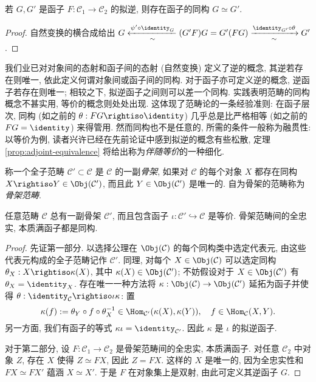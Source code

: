 \begin{proposition}
	若 $G, G'$ 是函子 $F: \mathcal{C}_1 \to \mathcal{C}_2$ 的拟逆, 则存在函子的同构 $G \simeq G'$.
\end{proposition}
\begin{proof}
	自然变换的横合成给出 $G \xleftarrow[\sim]{\psi' \circ \identity_G} (G'F)G = G'(FG) \xrightarrow[\sim]{\identity_{G'} \circ \theta} G'$.
\end{proof}

\begin{remark}\label{rem:strict-or-not}
	我们业已对对象间的态射和函子间的态射 (自然变换) 定义了逆的概念, 其逆若存在则唯一, 依此定义何谓对象间或函子间的同构. 对于函子亦可定义逆的概念, 逆函子若存在则唯一; 相较之下, 拟逆函子之间则可以差一个同构. 实践表明范畴的同构概念不甚实用, 等价的概念则处处出现. 这体现了范畴论的一条经验准则: 在函子层次, 同构 (如之前的 $\theta: FG \rightiso \identity$) 几乎总是比严格相等 (如之前的 $FG = \identity$) 来得管用. 然而同构也不是任意的, 所需的条件一般称为融贯性: 以等价为例, 读者兴许已经在先前论证中感到拟逆的概念有些松散, 定理 \ref{prop:adjoint-equivalence} 将给出称为\emph{伴随等价}的一种细化. 
\end{remark}

称一个全子范畴 $\mathcal{C}' \subset \mathcal{C}$ 是 $\mathcal{C}$ 的一副\emph{骨架}, 如果对 $\mathcal{C}$ 的每个对象 $X$ 都存在同构 $X \rightiso Y \in \Obj(\mathcal{C}')$, 而且此 $Y \in \Obj(\mathcal{C}')$ 是唯一的. 自为骨架的范畴称为\emph{骨架范畴}.

\begin{lemma}\label{prop:skeletal-cat-isom}
	任意范畴 $\mathcal{C}$ 总有一副骨架 $\mathcal{C}'$, 而且包含函子 $\iota: \mathcal{C}' \hookrightarrow \mathcal{C}$ 是等价. 骨架范畴间的全忠实, 本质满函子都是同构.
\end{lemma}
\begin{proof}
	先证第一部分. 以选择公理在 $\Obj(\mathcal{C})$ 的每个同构类中选定代表元, 由这些代表元构成的全子范畴记作 $\mathcal{C}'$. 同理, 对每个 $X \in \Obj(\mathcal{C})$ 可以选定同构 $\theta_X: X \rightiso \kappa(X) $, 其中 $\kappa(X) \in \Obj(\mathcal{C}')$; 不妨假设对于 $X \in \Obj(\mathcal{C}')$ 有 $\theta_X = \identity_X$. 存在唯一一种方法将 $\kappa: \Obj(\mathcal{C}) \to \Obj(\mathcal{C}')$ 延拓为函子并使得 $\theta: \identity_{\mathcal{C}} \rightiso \iota \kappa$: 置
	\[ \kappa(f) := \theta_Y \circ f \circ \theta_X^{-1} \in \Hom_{\mathcal{C}'}(\kappa(X), \kappa(Y)), \quad f \in \Hom_{\mathcal{C}}(X, Y). \]
	另一方面, 我们有函子的等式 $\kappa\iota = \identity_{\mathcal{C}'}$. 因此 $\kappa$ 是 $\iota$ 的拟逆函子.
	
	对于第二部分, 设 $F: \mathcal{C}_1 \to \mathcal{C}_2$ 是骨架范畴间的全忠实, 本质满函子. 对任意 $\mathcal{C}_2$ 中对象 $Z$, 存在 $X$ 使得 $Z \simeq FX$, 因此 $Z = FX$. 这样的 $X$ 是唯一的, 因为全忠实性和 $FX \simeq FX'$ 蕴涵 $X \simeq X'$. 于是 $F$ 在对象集上是双射, 由此可定义其逆函子 $G$.
\end{proof}

